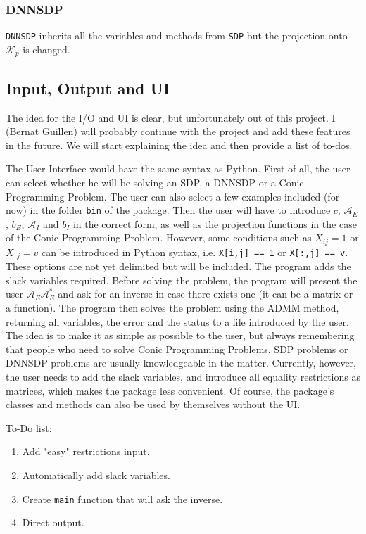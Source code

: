 \documentclass[paper=a4, fontsize=11pt]{scrartcl}
\numberwithin{equation}{section}		%
\numberwithin{figure}{section}			%
\numberwithin{table}{section}				%
\begin{document}
\subsubsection{DNNSDP}
\texttt{DNNSDP} inherits all the variables and methods from \texttt{SDP} but the projection onto $\mathcal{K}_p$ is changed.
\subsection{Input, Output and UI}
The idea for the I/O and UI is clear, but unfortunately out of this project. I (Bernat Guillen) will probably continue with the project and add these features in the future. We will start explaining the idea and then provide a list of to-dos.

The User Interface would have the same syntax as Python. First of all, the user can select whether he will be solving an SDP, a DNNSDP or a Conic Programming Problem. The user can also select a few examples included (for now) in the folder \texttt{bin} of the package. Then the user will have to introduce $c$, $\mathcal{A}_E$, $b_E$, $\mathcal{A}_I$ and $b_I$ in the correct form, as well as the projection functions in the case of the Conic Programming Problem. However, some conditions such as $X_{ij} = 1$ or $X_{:j} = v$ can be introduced in Python syntax, i.e. \texttt{X[i,j] == 1} or \texttt{X[:,j] == v}. These options are not yet delimited but will be included. The program adds the slack variables required. Before solving the problem, the program will present the user $\mathcal{A}_E\mathcal{A}_E^*$ and ask for an inverse in case there exists one (it can be a matrix or a function). The program then solves the problem using the ADMM method, returning all variables, the error and the status to a file introduced by the user. The idea is to make it as simple as possible to the user, but always remembering that people who need to solve Conic Programming Problems, SDP problems or DNNSDP problems are usually knowledgeable in the matter. Currently, however, the user needs to add the slack variables, and introduce all equality restrictions as matrices, which makes the package less convenient. Of course, the package's classes and methods can also be used by themselves without the UI.

To-Do list:
\begin{enumerate}
\item Add "easy" restrictions input.
\item Automatically add slack variables.
\item Create \texttt{main} function that will ask the inverse.
\item Direct output.
\end{enumerate}
\end{document}
